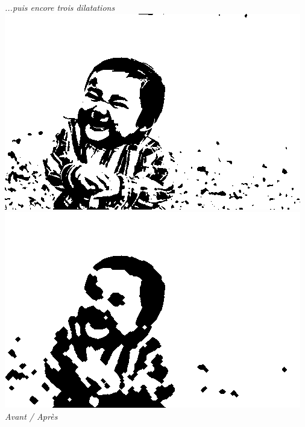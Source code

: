 \documentclass[a4paper,11pt]{article}
\begin{document}
\begin{center}
\textit{...puis encore trois dilatations}
\\
\includegraphics[scale=0.35]{babyo.png}
\includegraphics[scale=0.35]{babyd3e6d3.png}\\
\textit{Avant / Après}
\end{center}
\end{document}
